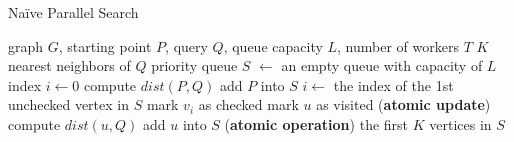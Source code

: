\begin{algorithm}
\caption{Na\"ive Parallel Search}\label{minjia_algo:naive_para_search}
\begin{algorithmic}[1]
\REQUIRE graph $G$, starting point $P$, query $Q$, queue capacity $L$, number of workers $T$
\ENSURE $K$ nearest neighbors of $Q$
\STATE priority queue $S$ $\gets$ an empty queue with capacity of $L$
\STATE index $i \gets 0$
\STATE compute $dist(P, Q)$
\STATE add $P$ into $S$
    \STATE $i \gets$ the index of the 1st unchecked vertex in $S$
    \STATE mark $v_i$ as checked
         \label{minjia_algo_line:naive_check_visited}
            \STATE mark $u$ as visited (\textbf{atomic update}) \label{minjia_algo_line:naive_modify_visited}
            \STATE compute $dist(u, Q)$ \label{minjia_algo_line:naive_compute}
            \STATE add $u$ into $S$ (\textbf{atomic operation}) \label{minjia_algo_line:naive_add}
        \ENDIF
    \ENDFOR
\ENDWHILE
\RETURN the first $K$ vertices in $S$
\end{algorithmic}
\end{algorithm}